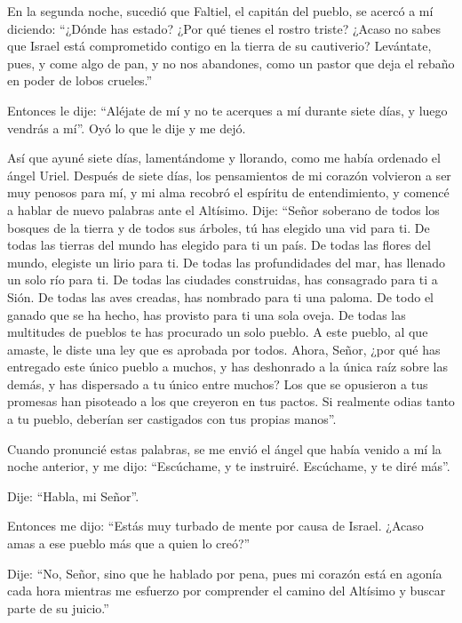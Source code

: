  En la segunda noche, sucedió que Faltiel, el capitán del
pueblo, se acercó a mí diciendo: ``¿Dónde has estado? ¿Por qué tienes el
rostro triste?  ¿Acaso no sabes que Israel está
comprometido contigo en la tierra de su cautiverio? 
Levántate, pues, y come algo de pan, y no nos abandones, como un pastor
que deja el rebaño en poder de lobos crueles.''

 Entonces le dije: ``Aléjate de mí y no te acerques a mí
durante siete días, y luego vendrás a mí''. Oyó lo que le dije y me
dejó.

 Así que ayuné siete días, lamentándome y llorando, como
me había ordenado el ángel Uriel.  Después de siete días,
los pensamientos de mi corazón volvieron a ser muy penosos para mí,
 y mi alma recobró el espíritu de entendimiento, y
comencé a hablar de nuevo palabras ante el Altísimo. 
Dije: ``Señor soberano de todos los bosques de la tierra y de todos sus
árboles, tú has elegido una vid para ti.  De todas las
tierras del mundo has elegido para ti un país. De todas las flores del
mundo, elegiste un lirio para ti.  De todas las
profundidades del mar, has llenado un solo río para ti. De todas las
ciudades construidas, has consagrado para ti a Sión.  De
todas las aves creadas, has nombrado para ti una paloma. De todo el
ganado que se ha hecho, has provisto para ti una sola oveja.
 De todas las multitudes de pueblos te has procurado un
solo pueblo. A este pueblo, al que amaste, le diste una ley que es
aprobada por todos.  Ahora, Señor, ¿por qué has entregado
este único pueblo a muchos, y has deshonrado a la única raíz sobre las
demás, y has dispersado a tu único entre muchos?  Los que
se opusieron a tus promesas han pisoteado a los que creyeron en tus
pactos.  Si realmente odias tanto a tu pueblo, deberían
ser castigados con tus propias manos''.

 Cuando pronuncié estas palabras, se me envió el ángel
que había venido a mí la noche anterior,  y me dijo:
``Escúchame, y te instruiré. Escúchame, y te diré más''.

 Dije: ``Habla, mi Señor''.

Entonces me dijo: ``Estás muy turbado de mente por causa de Israel.
¿Acaso amas a ese pueblo más que a quien lo creó?''

 Dije: ``No, Señor, sino que he hablado por pena, pues mi
corazón está en agonía cada hora mientras me esfuerzo por comprender el
camino del Altísimo y buscar parte de su juicio.''

